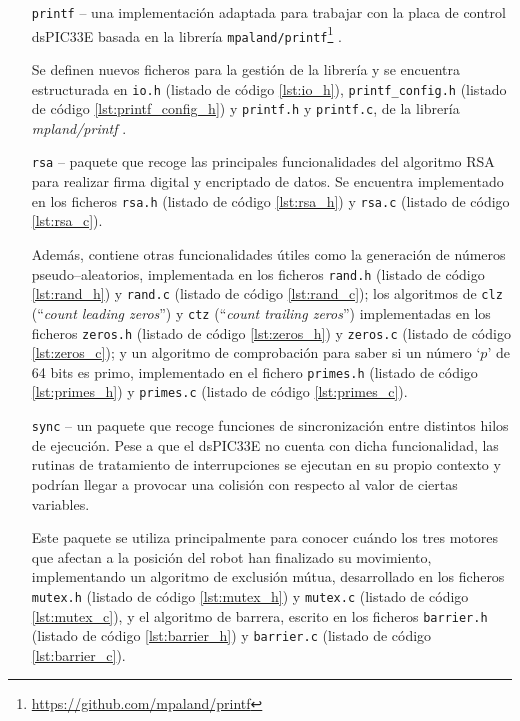 \begin{itemize}
    \item[\texttt{printf} --] una implementación adaptada para trabajar con la placa
    de control dsPIC33E basada en la librería
    \texttt{mpaland/printf}\footnote{\url{https://github.com/mpaland/printf}}
    \cite{palandMpalandPrintf2020}.

    Se definen nuevos ficheros para la gestión de la librería y se encuentra
    estructurada en \texttt{io.h} (listado de código \ref{lst:io_h}), 
    \texttt{printf\_config.h} (listado de código \ref{lst:printf_config_h}) y 
    \texttt{printf.h} y \texttt{printf.c}, de la librería \textit{mpland/printf}
    \cite{palandMpalandPrintf2020}.

    \item[\texttt{rsa} --] paquete que recoge las principales funcionalidades
    del algoritmo RSA para realizar firma digital y encriptado de datos. Se
    encuentra implementado en los ficheros \texttt{rsa.h} (listado de código
    \ref{lst:rsa_h}) y \texttt{rsa.c} (listado de código \ref{lst:rsa_c}).

    Además, contiene otras funcionalidades útiles como la generación de
    números pseudo--aleatorios, implementada en los ficheros \texttt{rand.h}
    (listado de código \ref{lst:rand_h}) y \texttt{rand.c} (listado de código
    \ref{lst:rand_c}); los algoritmos de \texttt{clz} 
    (``\textit{count leading zeros}'') y \texttt{ctz}
    (``\textit{count trailing zeros}'') implementadas en los ficheros
    \texttt{zeros.h} (listado de código \ref{lst:zeros_h}) y \texttt{zeros.c}
    (listado de código \ref{lst:zeros_c}); y un algoritmo de comprobación 
    para saber si un número `$p$' de 64 bits es primo, implementado en el
    fichero \texttt{primes.h} (listado de código \ref{lst:primes_h}) y
    \texttt{primes.c} (listado de código \ref{lst:primes_c}).

    \item[\texttt{sync} --] un paquete que recoge funciones de sincronización
    entre distintos hilos de ejecución. Pese a que el dsPIC33E no cuenta
    con dicha funcionalidad, las rutinas de tratamiento de interrupciones
    se ejecutan en su propio contexto y podrían llegar a provocar una colisión
    con respecto al valor de ciertas variables.

    Este paquete se utiliza principalmente para conocer cuándo los tres motores
    que afectan a la posición del robot han finalizado su movimiento,
    implementando un algoritmo de exclusión mútua, desarrollado en los ficheros
    \texttt{mutex.h} (listado de código \ref{lst:mutex_h}) y \texttt{mutex.c}
    (listado de código \ref{lst:mutex_c}), y el algoritmo de barrera,
    escrito en los ficheros \texttt{barrier.h} (listado de código
    \ref{lst:barrier_h}) y \texttt{barrier.c} (listado de código \ref{lst:barrier_c}).


\end{itemize}
